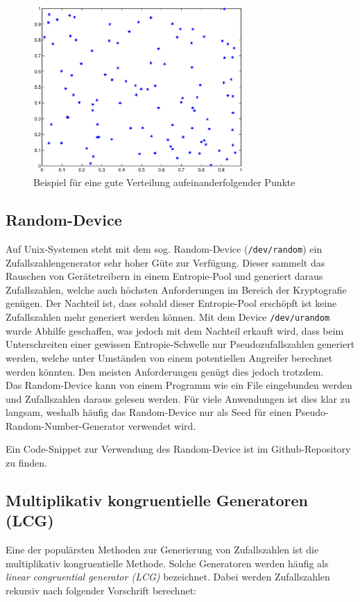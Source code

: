 \documentclass{book}
\begin{document}
\begin{refsection}
\begin{figure}[htbp]
	\centering
	\includegraphics[width=8cm]{images/Zufallszahlen_gut.eps}
	\caption{Beispiel für eine gute Verteilung aufeinanderfolgender Punkte}
	\label{fig:Zufallszahlen_gut}
\end{figure}

\subsection{Random-Device} \label{subsec:RandomDev}

Auf Unix-Systemen steht mit dem sog. Random-Device (\texttt{/dev/random}) ein Zufallszahlengenerator sehr hoher Güte zur Verfügung. Dieser sammelt das Rauschen von Gerätetreibern in einem Entropie-Pool und generiert daraus Zufallszahlen, welche auch höchsten Anforderungen im Bereich der Kryptografie genügen. Der Nachteil ist, dass sobald dieser Entropie-Pool erschöpft ist keine Zufallszahlen mehr generiert werden können. Mit dem Device \texttt{/dev/urandom} wurde Abhilfe geschaffen, was jedoch mit dem Nachteil erkauft wird, dass beim Unterschreiten einer gewissen Entropie-Schwelle nur Pseudozufallszahlen generiert werden, welche unter Umständen von einem potentiellen Angreifer berechnet werden könnten. Den meisten Anforderungen genügt dies jedoch trotzdem. \\

Das Random-Device kann von einem Programm wie ein File eingebunden werden und Zufallszahlen daraus gelesen werden. Für viele Anwendungen ist dies klar zu langsam, weshalb häufig das Random-Device nur als Seed für einen Pseudo-Random-Number-Generator verwendet wird.

Ein Code-Snippet zur Verwendung des Random-Device ist im Github-Repository \cite{rng:githubRepo} zu finden.


\subsection{Multiplikativ kongruentielle Generatoren (LCG)} \label{subsec:LCG}
Eine der populärsten Methoden zur Generierung von Zufallszahlen ist die multiplikativ kongruentielle Methode. Solche Generatoren werden häufig als \textit{linear congruential generator (LCG)} bezeichnet. Dabei werden Zufallszahlen rekursiv nach folgender Vorschrift berechnet:


\end{refsection}
\end{document}
